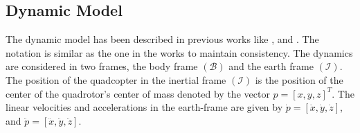 \documentclass{article}
\begin{document}
\subsection{Dynamic Model}
The dynamic model has been described in previous works like \cite{hoffmann2007quadrotor}, \cite{zheng2014second} and \cite{alexis2012model}. The notation is similar as the one in the works to maintain consistency. 
The dynamics are considered in two frames, the body frame $(\mathcal{B})$ and the earth frame $(\mathcal{I})$. The position of the quadcopter in the inertial frame $(\mathcal{I})$ is the position of the center of the quadrotor's center of mass denoted by the vector $p=[x,y,z]^{T}$. The linear velocities and accelerations in the earth-frame are given by $\dot{p}=[\dot{x},\dot{y},\dot{z}]$, and $\ddot{p}=[\ddot{x},\ddot{y},\ddot{z}]$. 
\end{document}
